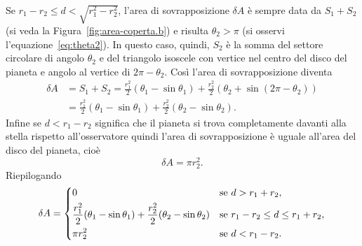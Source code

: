 Se $r_1 - r_2 \leq d < \sqrt{r_1^2 - r_2^2}$, l'area di sovrapposizione
$\delta A$ è sempre data da $S_1 + S_2$ (si veda la
Figura~\ref{fig:area-coperta.b}) e risulta $\theta_2 > \pi$ (si osservi
l'equazione~\eqref{eq:theta2}). In questo caso, quindi, $S_2$ è la somma del
settore circolare di angolo $\theta_2$ e del triangolo isoscele con vertice nel
centro del disco del pianeta e angolo al vertice di $2\pi - \theta_2$. Così
l'area di sovrapposizione diventa
\begin{equation}
  \begin{split}
    \delta A &= S_1 + S_2 = \frac{r_1^2}{2}(\theta_1 - \sin\theta_1) +
    \frac{r_2^2}{2}(\theta_2 + \sin(2\pi -\theta_2)) \\
    &= \frac{r_1^2}{2}(\theta_1 - \sin\theta_1) + \frac{r_2^2}{2}(\theta_2 -
    \sin\theta_2).
  \end{split}
\end{equation}
Infine se $d < r_1 - r_2$ significa che il pianeta si trova completamente
davanti alla stella rispetto all'osservatore quindi l'area di sovrapposizione è
uguale all'area del disco del pianeta, cioè
\begin{equation}
  \delta A = \pi r_2^2.
\end{equation}
Riepilogando
\begin{equation}
  \delta A =
  \begin{dcases}
    0 & \text{se $d > r_1 + r_2$}, \\
    \frac{r_1^2}{2}(\theta_1 - \sin\theta_1) + \frac{r_2^2}{2}(\theta_2 -
    \sin\theta_2) & \text{se $r_1 - r_2 \leq d \leq r_1 + r_2$}, \\
    \pi r_2^2 & \text{se $d < r_1 - r_2$}.
  \end{dcases}
\end{equation}

